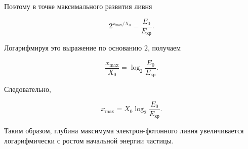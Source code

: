 \documentclass[../final.tex]{subfiles}
\begin{document}
Поэтому в точке максимального развития ливня

\begin{equation*}
    2^{x_{\max}/X_0}
    =
    \frac{E_0}{E_{\text{кр}}}.
\end{equation*}

Логарифмируя это выражение по основанию $2$, получаем

\begin{equation*}
    \frac{x_{\max}}{X_0}
    =
    \log_2
    \frac{E_0}{E_{\text{кр}}}.
\end{equation*}

Следовательно,

\begin{equation*}
    x_{\max}
    =
    X_0
    \log_2
    \frac{E_0}{E_{\text{кр}}}.
\end{equation*}

Таким образом, глубина максимума электрон-фотонного ливня
увеличивается логарифмически с ростом начальной энергии частицы.
\end{document}
